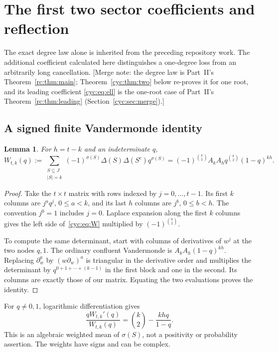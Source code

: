 \documentclass[11pt,a4paper]{article}
\numberwithin{equation}{section}
\newtheorem{lemma}[theorem]{Lemma}
\theoremstyle{definition}
\theoremstyle{remark}
\begin{document}
\section{The first two sector coefficients and reflection}\label{cyc:sec:coefficients}

The exact degree law alone is inherited from the preceding repository
work.  The additional coefficient calculated here distinguishes a
one-degree loss from an arbitrarily long cancellation.
[Merge note: the degree law is Part~II's Theorem~\ref{rc:thm:main};
Theorem~\ref{cyc:thm:two} below re-proves it for one root, and its
leading coefficient \eqref{cyc:eq:ell} is the one-root case of Part~II's
Theorem~\ref{rc:thm:leading} (Section~\ref{cyc:sec:merge}).]

\subsection{A signed finite Vandermonde identity}
\begin{lemma}\label{cyc:lem:W}
For $h=t-k$ and an indeterminate $q$,
\begin{equation}\label{cyc:eq:W}
 W_{t,k}(q):=
 \sum_{\substack{S\subseteq J\\|S|=k}}
 (-1)^{\sigma(S)}\Delta(S)\Delta(S^c)q^{\sigma(S)}
 =(-1)^{\binom k2}A_kA_h q^{\binom k2}(1-q)^{kh}.
\end{equation}
\end{lemma}
\begin{proof}
Take the $t\times t$ matrix with rows indexed by $j=0,\ldots,t-1$.
Its first $k$ columns are $j^a q^j$, $0\le a<k$, and its last $h$
columns are $j^b$, $0\le b<h$.  The convention $j^0=1$ includes $j=0$.
Laplace expansion along the first $k$ columns gives the left side
of~\eqref{cyc:eq:W} multiplied by $(-1)^{\binom k2}$.

To compute the same determinant, start with columns of derivatives
of $w^j$ at the two nodes $q,1$.  The ordinary confluent Vandermonde
is $A_kA_h(1-q)^{kh}$.  Replacing $\partial_w^a$ by
$(w\partial_w)^a$ is triangular in the derivative order and multiplies
the determinant by $q^{0+1+\cdots+(k-1)}$ in the first block and one
in the second.  Its columns are exactly those of our matrix.
Equating the two evaluations proves the identity.
\end{proof}

For $q\ne0,1$, logarithmic differentiation gives
\begin{equation}\label{cyc:eq:Wmean}
 \frac{qW_{t,k}'(q)}{W_{t,k}(q)}
 =\binom k2-\frac{khq}{1-q}.
\end{equation}
This is an algebraic weighted mean of $\sigma(S)$, not a positivity
or probability assertion.  The weights have signs and can be complex.
\end{document}
